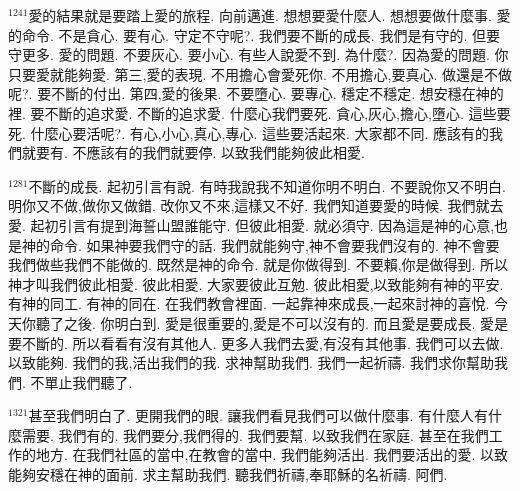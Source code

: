\documentclass{book}
\begin{document}
$^{1241}$愛的結果就是要踏上愛的旅程.
向前邁進.
想想要愛什麼人.
想想要做什麼事.
愛的命令.
不是貪心.
要有心.
守定不守呢?.
我們要不斷的成長.
我們是有守的.
但要守更多.
愛的問題.
不要灰心.
要小心.
有些人說愛不到.
為什麼?.
因為愛的問題.
你只要愛就能夠愛.
第三,愛的表現.
不用擔心會愛死你.
不用擔心,要真心.
做還是不做呢?.
要不斷的付出.
第四,愛的後果.
不要墮心.
要專心.
穩定不穩定.
想安穩在神的裡.
要不斷的追求愛.
不斷的追求愛.
什麼心我們要死.
貪心,灰心,擔心,墮心.
這些要死.
什麼心要活呢?.
有心,小心,真心,專心.
這些要活起來.
大家都不同.
應該有的我們就要有.
不應該有的我們就要停.
以致我們能夠彼此相愛.

$^{1281}$不斷的成長.
起初引言有說.
有時我說我不知道你明不明白.
不要說你又不明白.
明你又不做,做你又做錯.
改你又不來,這樣又不好.
我們知道要愛的時候.
我們就去愛.
起初引言有提到海誓山盟誰能守.
但彼此相愛.
就必須守.
因為這是神的心意,也是神的命令.
如果神要我們守的話.
我們就能夠守,神不會要我們沒有的.
神不會要我們做些我們不能做的.
既然是神的命令.
就是你做得到.
不要賴,你是做得到.
所以神才叫我們彼此相愛.
彼此相愛.
大家要彼此互勉.
彼此相愛,以致能夠有神的平安.
有神的同工.
有神的同在.
在我們教會裡面.
一起靠神來成長,一起來討神的喜悅.
今天你聽了之後.
你明白到.
愛是很重要的,愛是不可以沒有的.
而且愛是要成長.
愛是要不斷的.
所以看看有沒有其他人.
更多人我們去愛,有沒有其他事.
我們可以去做.
以致能夠.
我們的我,活出我們的我.
求神幫助我們.
我們一起祈禱.
我們求你幫助我們.
不單止我們聽了.

$^{1321}$甚至我們明白了.
更開我們的眼.
讓我們看見我們可以做什麼事.
有什麼人有什麼需要.
我們有的.
我們要分,我們得的.
我們要幫.
以致我們在家庭.
甚至在我們工作的地方.
在我們社區的當中,在教會的當中.
我們能夠活出.
我們要活出的愛.
以致能夠安穩在神的面前.
求主幫助我們.
聽我們祈禱,奉耶穌的名祈禱.
阿們.
\newpage
\end{document}
